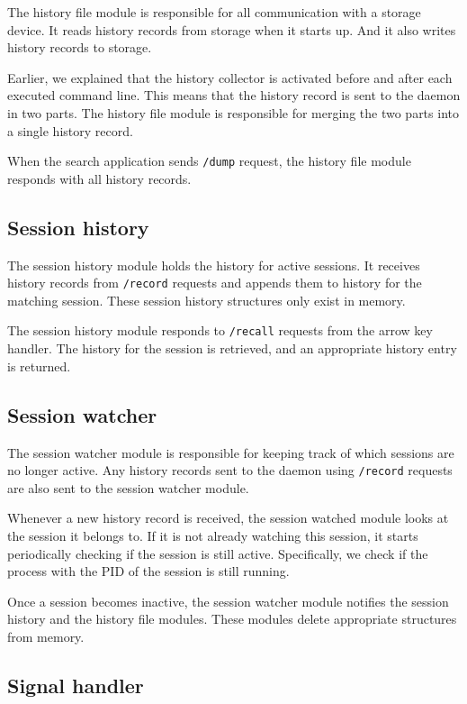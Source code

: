 The history file module is responsible for all communication with a storage device. It reads history records from storage when it starts up. And it also writes history records to storage.

Earlier, we explained that the history collector is activated before and after each executed command line. This means that the history record is sent to the daemon in two parts. The history file module is responsible for merging the two parts into a single history record. 

When the search application sends \verb|/dump| request, the history file module responds with all history records. 


\subsection{Session history}

The session history module holds the history for active sessions. It receives history records from \verb|/record| requests and appends them to history for the matching session.
These session history structures only exist in memory.

The session history module responds to \verb|/recall| requests from the arrow key handler. The history for the session is retrieved, and an appropriate history entry is returned. 

\subsection{Session watcher}

The session watcher module is responsible for keeping track of which sessions are no longer active. Any history records sent to the daemon using \verb|/record| requests are also sent to the session watcher module. 

Whenever a new history record is received, the session watched module looks at the session it belongs to. If it is not already watching this session, it starts periodically checking if the session is still active. Specifically, we check if the process with the PID of the session is still running.

Once a session becomes inactive, the session watcher module notifies the session history and the history file modules. These modules delete appropriate structures from memory.

\subsection{Signal handler}

